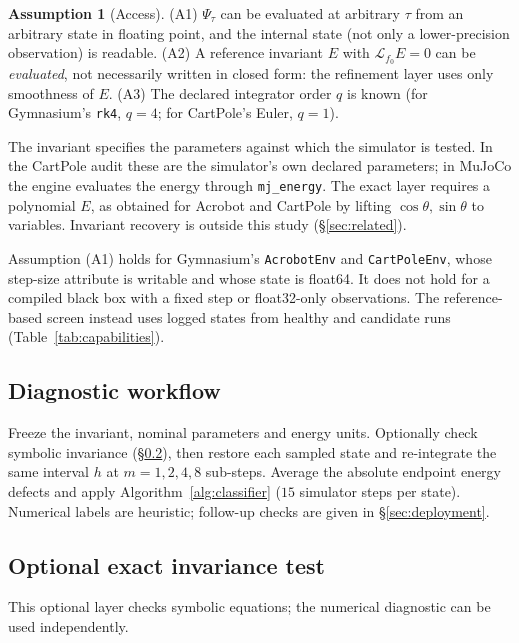 \documentclass[10pt]{article}
\theoremstyle{definition}
\newtheorem{assumption}{Assumption}
\newcommand{\Lie}{\mathcal{L}}
\begin{document}
\begin{assumption}[Access]\label{ass:access}
(A1) $\Psi_\tau$ can be evaluated at arbitrary $\tau$ from an arbitrary
state in floating point, and the internal state (not only a
lower-precision observation) is readable. (A2) A reference invariant $E$
with $\Lie_{f_0}E=0$ can be \emph{evaluated}, not necessarily written in
closed form: the refinement layer uses only smoothness of $E$. (A3) The
declared integrator order $q$ is known (for Gymnasium's \texttt{rk4}, $q=4$;
for CartPole's Euler, $q=1$).
\end{assumption}

The invariant specifies the parameters against which the simulator is tested.
In the CartPole audit these are the simulator's own declared parameters; in
MuJoCo the engine evaluates the energy through \texttt{mj\_energy}. The exact
layer requires a polynomial $E$, as obtained for Acrobot and CartPole by
lifting $\cos\theta,\sin\theta$ to variables. Invariant recovery is outside
this study (\S\ref{sec:related}).

Assumption (A1) holds for
Gymnasium's \texttt{AcrobotEnv} and \texttt{CartPoleEnv}, whose step-size
attribute is writable and whose state is float64. It does not hold for a
compiled black box with a fixed step or float32-only observations. The
reference-based screen instead uses logged states from healthy and candidate
runs (Table~\ref{tab:capabilities}).

\subsection{Diagnostic workflow}\label{sec:workflow}

Freeze the invariant, nominal parameters and energy units. Optionally check
symbolic invariance (\S\ref{sec:exact}), then restore each sampled state and
re-integrate the same interval $h$ at $m=1,2,4,8$ sub-steps. Average the
absolute endpoint energy defects and apply Algorithm~\ref{alg:classifier}
($15$ simulator steps per state). Numerical labels are heuristic; follow-up
checks are given in \S\ref{sec:deployment}.

\subsection{Optional exact invariance test}\label{sec:exact}

This optional layer checks symbolic equations; the numerical diagnostic can be
used independently.
\end{document}
